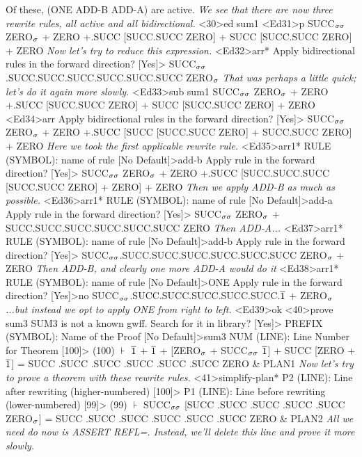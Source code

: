 \begin{tpsexample}
Of these, (ONE ADD-B ADD-A) are active.
{\it We see that there are now three rewrite rules, all active and all bidirectional.}
<30>ed sum1
<Ed31>p
SUCC\(\sb{\sigma\sigma}\) ZERO\(\sb{\sigma}\) + ZERO +.SUCC [SUCC.SUCC ZERO] + SUCC [SUCC.SUCC ZERO] + ZERO
{\it Now let's try to reduce this expression.}
<Ed32>arr*
Apply bidirectional rules in the forward direction? [Yes]>
SUCC\(\sb{\sigma\sigma}\).SUCC.SUCC.SUCC.SUCC.SUCC.SUCC ZERO\(\sb{\sigma}\)
{\it That was perhaps a little quick; let's do it again more slowly.}
<Ed33>sub sum1
SUCC\(\sb{\sigma\sigma}\) ZERO\(\sb{\sigma}\) + ZERO +.SUCC [SUCC.SUCC ZERO] + SUCC [SUCC.SUCC ZERO] + ZERO
<Ed34>arr
Apply bidirectional rules in the forward direction? [Yes]>
SUCC\(\sb{\sigma\sigma}\) ZERO\(\sb{\sigma}\) + ZERO +.SUCC [SUCC [SUCC.SUCC ZERO] + SUCC.SUCC ZERO] + ZERO
{\it Here we took the first applicable rewrite rule.}
<Ed35>arr1*
RULE (SYMBOL): name of rule [No Default]>add-b
Apply rule in the forward direction? [Yes]>
SUCC\(\sb{\sigma\sigma}\) ZERO\(\sb{\sigma}\) + ZERO +.SUCC [SUCC.SUCC.SUCC [SUCC.SUCC ZERO] + ZERO] + ZERO
{\it Then we apply ADD-B as much as possible.}
<Ed36>arr1*
RULE (SYMBOL): name of rule [No Default]>add-a
Apply rule in the forward direction? [Yes]>
SUCC\(\sb{\sigma\sigma}\) ZERO\(\sb{\sigma}\) + SUCC.SUCC.SUCC.SUCC.SUCC.SUCC ZERO
{\it Then ADD-A...}
<Ed37>arr1*
RULE (SYMBOL): name of rule [No Default]>add-b
Apply rule in the forward direction? [Yes]>
SUCC\(\sb{\sigma\sigma}\).SUCC.SUCC.SUCC.SUCC.SUCC.SUCC ZERO\(\sb{\sigma}\) + ZERO
{\it Then ADD-B, and clearly one more ADD-A would do it}
<Ed38>arr1*
RULE (SYMBOL): name of rule [No Default]>ONE
Apply rule in the forward direction? [Yes]>no
SUCC\(\sb{\sigma\sigma}\).SUCC.SUCC.SUCC.SUCC.SUCC.\(\mathord{\overline{1}}\) + ZERO\(\sb{\sigma}\)
{\it ...but instead we opt to apply ONE from right to left.}
<Ed39>ok
<40>prove sum3
SUM3 is not a known gwff. Search for it in library? [Yes]>
PREFIX (SYMBOL): Name of the Proof [No Default]>sum3
NUM (LINE): Line Number for Theorem [100]>
(100)  \(\assert\)   \(\mathord{\overline{1}}\) + \(\mathord{\overline{1}}\) + [ZERO\(\sb{\sigma}\) + SUCC\(\sb{\sigma\sigma}\) \(\mathord{\overline{1}}\)] + SUCC [ZERO + \(\mathord{\overline{1}}\)]
          = SUCC .SUCC .SUCC .SUCC .SUCC .SUCC ZERO & PLAN1
{\it Now let's try to prove a theorem with these rewrite rules.}
<41>simplify-plan*
P2 (LINE): Line after rewriting (higher-numbered) [100]>
P1 (LINE): Line before rewriting (lower-numbered) [99]>
(99)   \(\assert\)   SUCC\(\sb{\sigma\sigma}\) [SUCC .SUCC .SUCC .SUCC .SUCC ZERO\(\sb{\sigma}\)]
          = SUCC .SUCC .SUCC .SUCC .SUCC .SUCC ZERO & PLAN2
{\it All we need do now is ASSERT REFL=. Instead, we'll delete this line and prove it more slowly.}

\end{tpsexample}
